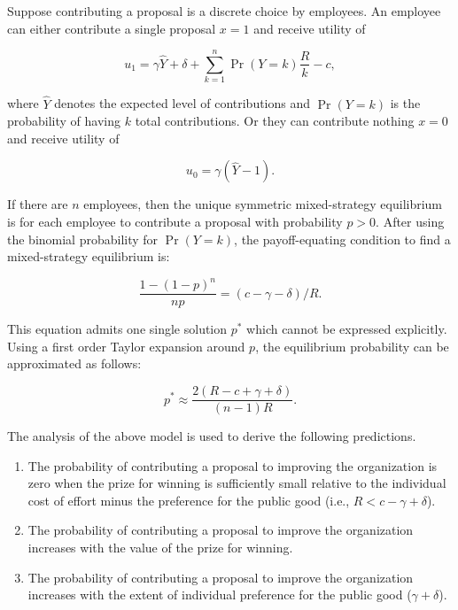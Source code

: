 \documentclass[12pt, titlepage]{article}
\begin{document}
Suppose contributing a proposal is a discrete choice by employees. An
employee can either contribute a single proposal \(x=1\) and receive
utility of

\begin{equation}
    u_1 = \gamma \hat Y + \delta + \sum_{k=1}^{n}\Pr(Y=k)\frac{R}{k}  - c, 
\end{equation}

where \(\hat Y\) denotes the expected level of contributions and
\(\Pr(Y=k)\) is the probability of having \(k\) total contributions. Or
they can contribute nothing \(x=0\) and receive utility of

\begin{equation}
  u_0 = \gamma (\hat Y - 1).
\end{equation}

If there are \(n\) employees, then the unique symmetric mixed-strategy
equilibrium is for each employee to contribute a proposal with
probability \(p>0\). After using the binomial probability for
\(\Pr(Y=k)\), the payoff-equating condition to find a mixed-strategy
equilibrium is:

\begin{equation} \label{eq: mixed-strategy}
  \frac{1- (1-p)^{n}}{n p} = (c- \gamma - \delta) / R.
\end{equation}

This equation admits one single solution \(p^*\) which cannot be
expressed explicitly. Using a first order Taylor expansion around \(p\),
the equilibrium probability can be approximated as follows:

\begin{equation} \label{eq: probability}
  p^*  \approx \frac{2 (R- c+\gamma +\delta )}{(n-1) R}. 
\end{equation}

The analysis of the above model is used to derive the following
predictions.

\begin{enumerate}
\def\labelenumi{\arabic{enumi})}
\item
  The probability of contributing a proposal to improving the
  organization is zero when the prize for winning is sufficiently small
  relative to the individual cost of effort minus the preference for the
  public good (i.e., \(R< c-\gamma +\delta\)).
\item
  The probability of contributing a proposal to improve the organization
  increases with the value of the prize for winning.
\item
  The probability of contributing a proposal to improve the organization
  increases with the extent of individual preference for the public good
  (\(\gamma+\delta\)).
\end{enumerate}
\end{document}
